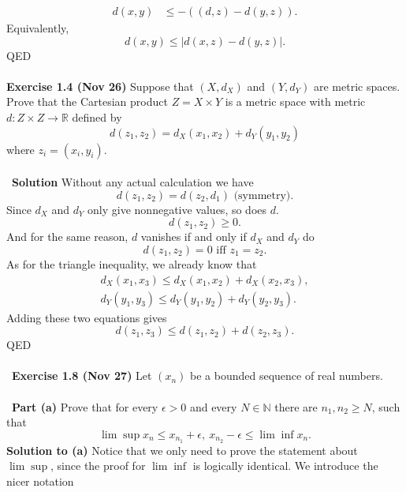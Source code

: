 \documentclass[12 pt]{article}
\newcommand{\R}{\mathbb{R}}
\newcommand{\N}{\mathbb{N}}
\numberwithin{equation}{section}
\begin{document}
{\begin{align*}
d(x,y) & \leq - ((d,z) - d(y,z)).
\end{align*}
Equivalently, \begin{equation*}
d(x,y) \leq |d(x,z) - d(y,z)|.
\end{equation*}
QED\\
\\
\textbf{Exercise 1.4 (Nov 26)} Suppose that $(X, d_X)$ and $(Y, d_Y)$ are metric spaces. Prove that the Cartesian product $Z = X \times Y$ is a metric space with metric $d: Z \times Z \to \R$ defined by \begin{equation*}
d(z_1, z_2) = d_X(x_1, x_2) + d_Y(y_1, y_2)
\end{equation*}
where $z_i = (x_i, y_i)$.\\
\\
\
\textbf{Solution} Without any actual calculation we have \begin{equation*}
d(z_1, z_2) = d(z_2, d_1) \mbox{ (symmetry)}.
\end{equation*}
Since $d_X$ and $d_Y$ only give nonnegative values, so does $d$. \begin{equation*}
d(z_1, z_2) \geq 0.
\end{equation*}
And for the same reason, $d$ vanishes if and only if $d_X$ and $d_Y$ do \begin{equation*}
d(z_1, z_2) = 0 \mbox{ iff } z_1 = z_2.
\end{equation*}
As for the triangle inequality, we already know that \begin{align*}
d_X(x_1, x_3) \leq d_X(x_1, x_2) + d_X(x_2, x_3), \\
d_Y(y_1, y_3) \leq d_Y(y_1, y_2) + d_Y(y_2, y_3).
\end{align*}
Adding these two equations gives \begin{equation*}
d(z_1, z_3) \leq d(z_1, z_2) + d(z_2, z_3).
\end{equation*}
QED\\
\\
\
\textbf{Exercise 1.8 (Nov 27)} Let $(x_n)$ be a bounded sequence of real numbers. \\
\\
\
\textbf{Part (a)} Prove that for every $\epsilon > 0$ and every $N \in \N$ there are $n_1, n_2 \geq N$, such that \begin{equation*}
\lim \sup x_n \leq x_{n_1} + \epsilon, \ x_{n_2} - \epsilon \leq \lim \inf x_n .
\end{equation*}
\textbf{Solution to (a)} Notice that we only need to prove the statement about $\lim \sup$, since the proof for $\lim \inf$ is logically identical. We introduce the nicer notation \begin{equation*}

\end{equation*}}
\end{document}
